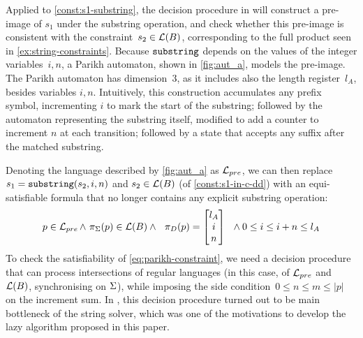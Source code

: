Applied to \cref{const:s1-substring}, the decision procedure in
\cite{ostrich-plus} will construct a pre-image of $s_1$ under the substring
operation, and check whether this pre-image is consistent with the constraint~$s_2 \in \operatorname{\mathcal{L}}(B)$, corresponding to the full product seen in
\cref{ex:string-constraints}. Because $\operatorname{\mathtt{substring}}$ depends on the
values of the integer variables~$i, n$, a Parikh automaton,
shown in \cref{fig:aut_a}, models the pre-image. The Parikh automaton
has dimension~$3$, as it includes also the length register~$l_{A}$, besides
variables $i, n$.  Intuitively, this construction
accumulates any prefix symbol, incrementing
$i$ to mark the start of the substring; followed by the automaton representing
the substring itself, modified to add a counter to increment $n$ at each
transition; followed by a state that accepts any
suffix after the matched substring.

Denoting the language described by \cref{fig:aut_a} as $\operatorname{\mathcal{L}}_{pre}$, we can
then replace $s_1 = \operatorname{\mathtt{substring}}(s_2, i, n)$ and $s_2 \in
\operatorname{\mathcal{L}}(B)$ (of \cref{const:s1-in-c-dd}) with an
equi-satisfiable formula that no longer contains any explicit substring
operation:
%
\begin{equation}
  \label{eq:parikh-constraint}
  p \in \operatorname{\mathcal{L}}_{pre} \wedge~
  \pi_\Sigma(p) \in \operatorname{\mathcal{L}}(B)
  \wedge~~ \pi_D(p) =
  \begin{bmatrix}
    l_{A} \\ i \\ n
  \end{bmatrix}~~
  \wedge 0 \leq i \leq i + n \leq l_{A}
\end{equation}
%
To check the satisfiability of \cref{eq:parikh-constraint}, we need a
decision procedure that can process intersections of regular languages
(in this case, of $\operatorname{\mathcal{L}}_{pre}$ and $\operatorname{\mathcal{L}}(B)$, synchronising
on $\Sigma$), while imposing the side
condition~$0 \leq n \leq m \leq |p|$ on the increment sum. In
\cite{ostrich-plus}, this decision procedure turned out to be main
bottleneck of the string solver, which was one of the motivations to
develop the lazy algorithm proposed in this paper.

